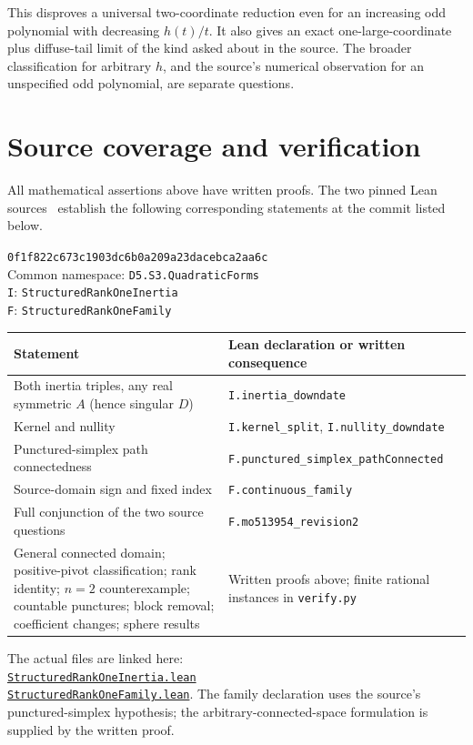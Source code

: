 \documentclass[11pt]{article}
\begin{document}
This disproves a universal two-coordinate reduction even for an increasing
odd polynomial with decreasing $h(t)/t$. It also gives an exact
one-large-coordinate plus diffuse-tail limit of the kind asked about in
the source. The broader classification for arbitrary $h$, and the
source's numerical observation for an unspecified odd polynomial,
are separate questions.

\section{Source coverage and verification}\label{sec:coverage}
All mathematical assertions above have written proofs.
The two pinned Lean sources~\cite{inertialean,familylean} establish the
following corresponding statements at the commit listed below.
\begin{flushleft}\small
\texttt{0f1f822c673c1903dc6b0a209a23dacebca2aa6c}\\
Common namespace: \texttt{D5.S3.QuadraticForms}\\
\texttt{I}: \texttt{StructuredRankOneInertia}\\
\texttt{F}: \texttt{StructuredRankOneFamily}
\end{flushleft}
\begin{center}\small
\begin{tabularx}{\linewidth}{@{}>{\raggedright\arraybackslash}p{.32\linewidth}>{\raggedright\arraybackslash}X@{}}
\toprule
Statement & Lean declaration or written consequence\\
\midrule
Both inertia triples, any real symmetric $A$ (hence singular $D$)
 & \texttt{I.inertia\_downdate}\\
Kernel and nullity
 & \texttt{I.kernel\_split}, \texttt{I.nullity\_downdate}\\
Punctured-simplex path connectedness
 & \texttt{F.punctured\_simplex\_pathConnected}\\
Source-domain sign and fixed index
 & \texttt{F.continuous\_family}\\
Full conjunction of the two source questions
 & \texttt{F.mo513954\_revision2}\\
General connected domain; positive-pivot classification;
rank identity; $n=2$ counterexample; countable punctures;
block removal; coefficient changes; sphere results
 & Written proofs above; finite rational instances in \texttt{verify.py}\\
\bottomrule
\end{tabularx}
\end{center}
The actual files are linked here:\\
\href{https://github.com/the-omega-institute/trureturing/blob/0f1f822c673c1903dc6b0a209a23dacebca2aa6c/D5/S3/QuadraticForms/StructuredRankOneInertia.lean}{\texttt{StructuredRankOneInertia.lean}}\\
\href{https://github.com/the-omega-institute/trureturing/blob/0f1f822c673c1903dc6b0a209a23dacebca2aa6c/D5/S3/QuadraticForms/StructuredRankOneFamily.lean}{\texttt{StructuredRankOneFamily.lean}}.
The family declaration uses the source's punctured-simplex hypothesis;
the arbitrary-connected-space formulation is supplied by the written proof.
\end{document}
